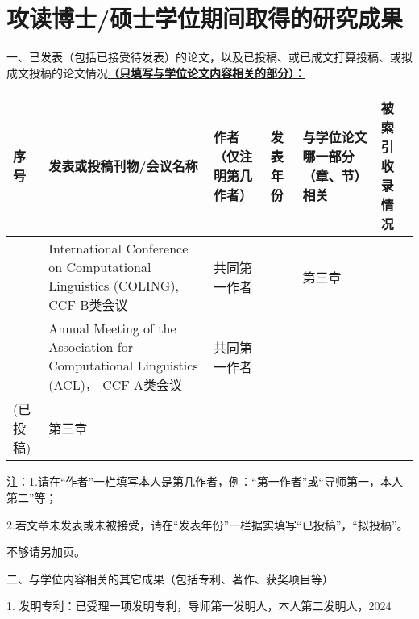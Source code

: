 \chapter{攻读博士/硕士学位期间取得的研究成果} %
\pubfont %
一、已发表（包括已接受待发表）的论文，以及已投稿、或已成文打算投稿、或拟成文投稿的论文情况\underline{\textbf{（只填写与学位论文内容相关的部分）：}}
\begin{table}
	\centering{}%
	\pubfont 
	\begin{longtable}{|>{\centering}m{0.5cm}|m{4.2cm}|>{\centering}m{2.3cm}|>{\centering}m{1.8cm}|>{\centering}m{2cm}|>{\centering}m{1.5cm}|}
		\hline 
		\textbf{序号} & \textbf{发表或投稿刊物/会议名称} & \textbf{作者（仅注明第几作者）} & \textbf{发表年份} & \textbf{与学位论文哪一部分（章、节）相关} &\textbf{被索引收录情况}\tabularnewline
		\hline 
		1 & International Conference on Computational Linguistics (COLING), CCF-B类会议 & 共同第一作者 & 2024 & 第三章 & \tabularnewline
		\hline 
		2 & Annual Meeting of the Association for Computational Linguistics (ACL)， CCF-A类会议 & 共同第一作者 & \begin{tabular}{c}
			2024 \\ (已投稿)
		\end{tabular} & 第三章 & \tabularnewline
		\hline 
	\end{longtable}
\end{table}

注：1.请在“作者”一栏填写本人是第几作者，例：“第一作者”或“导师第一，本人第二”等；

   2.若文章未发表或未被接受，请在“发表年份”一栏据实填写“已投稿”，“拟投稿”。

   不够请另加页。
\newline

二、与学位内容相关的其它成果（包括专利、著作、获奖项目等）

1. 发明专利：已受理一项发明专利，导师第一发明人，本人第二发明人，2024




\normalsize %